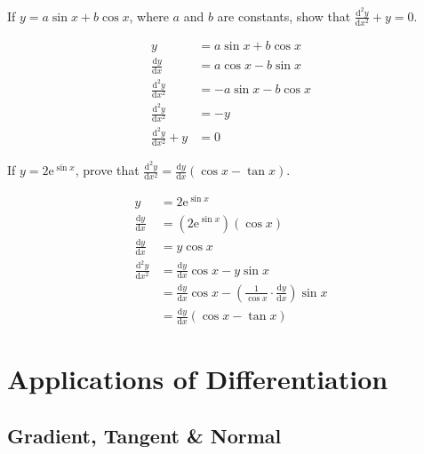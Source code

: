 \documentclass[11pt,a4paper]{book}
\begin{document}
\begin{example}

If $y=a\sin x+b\cos x$, where $a$ and $b$ are constants, show that
${\displaystyle \frac{\mathrm{d}^{2}y}{\mathrm{d}x^{2}}+y=0}$.

\Solution
\begin{align*}
y & =a\sin x+b\cos x\\
\frac{\mathrm{d}y}{\mathrm{d}x} & =a\cos x-b\sin x\\
\frac{\mathrm{d}^{2}y}{\mathrm{d}x^{2}} & =-a\sin x-b\cos x\\
\frac{\mathrm{d}^{2}y}{\mathrm{d}x^{2}} & =-y\\
\frac{\mathrm{d}^{2}y}{\mathrm{d}x^{2}}+y & =0
\end{align*}


\end{example}


\begin{example}

If $y=2\text{e}^{\sin x}$, prove that ${\displaystyle \frac{\mathrm{d}^{2}y}{\mathrm{d}x^{2}}=\frac{\mathrm{d}y}{\mathrm{d}x}\left(\cos x-\tan x\right)}$.

\Solution
\begin{align*}
y & =2\text{e}^{\sin x}\\
\frac{\mathrm{d}y}{\mathrm{d}x} & =\left(2\text{e}^{\sin x}\right)\left(\cos x\right)\\
\frac{\mathrm{d}y}{\mathrm{d}x} & =y\cos x\\
\frac{\mathrm{d}^{2}y}{\mathrm{d}x^{2}} & =\frac{\mathrm{d}y}{\mathrm{d}x}\cos x-y\sin x\\
 & =\frac{\mathrm{d}y}{\mathrm{d}x}\cos x-\left(\frac{1}{\cos x}\cdot\frac{\mathrm{d}y}{\mathrm{d}x}\right)\sin x\\
 & =\frac{\mathrm{d}y}{\mathrm{d}x}\left(\cos x-\tan x\right)
\end{align*}

\end{example}

\chapter{Applications of Differentiation}
\section{Gradient, Tangent \& Normal}
\end{document}
